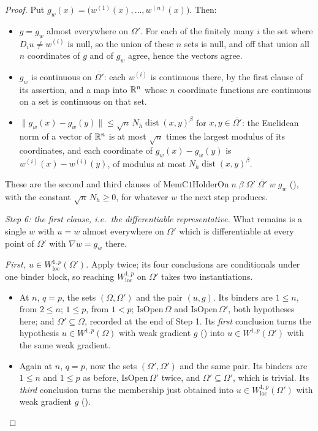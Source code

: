 \begin{proof}
Put $g_w(x)=\bigl(w^{(1)}(x),\dots,w^{(n)}(x)\bigr)$.  Then:
\begin{itemize}
\item $g=g_w$ almost everywhere on $\Omega'$.  For each of the finitely many $i$
  the set where $D_iu\ne w^{(i)}$ is null, so the union of these $n$ sets is
  null, and off that union all $n$ coordinates of $g$ and of $g_w$ agree, hence
  the vectors agree.
\item $g_w$ is continuous on $\overline{\Omega'}$: each $w^{(i)}$ is continuous
  there, by the first clause of its  assertion, and a map
  into $\mathbb{R}^n$ whose $n$ coordinate functions are continuous on a set is
  continuous on that set.
\item $\|g_w(x)-g_w(y)\|\le\sqrt n\,N_h\operatorname{dist}(x,y)^{\beta}$ for
  $x,y\in\overline{\Omega'}$: the Euclidean norm of a vector of $\mathbb{R}^n$ is at
  most $\sqrt n$ times the largest modulus of its coordinates, and each
  coordinate of $g_w(x)-g_w(y)$ is $w^{(i)}(x)-w^{(i)}(y)$, of modulus at most
  $N_h\operatorname{dist}(x,y)^{\beta}$.
\end{itemize}
These are the second and third clauses of
$\mathrm{MemC1HolderOn}\;n\;\beta\;\Omega'\;\overline{\Omega'}\;w\;g_w$
(), with the constant $\sqrt n\,N_h\ge0$, for whatever
$w$ the next step produces.

\emph{Step 6: the first clause, i.e.\ the differentiable representative.}  What
remains is a single $w$ with $u=w$ almost everywhere on $\Omega'$ which is
differentiable at every point of $\Omega'$ with $\nabla w=g_w$ there.

\emph{First, $u\in W^{1,p}_{\mathrm{loc}}(\Omega')$.}  Apply
 twice; its four conclusions are conditionals
under one binder block, so reaching $W^{1,p}_{\mathrm{loc}}$ on $\Omega'$ takes
two instantiations.
\begin{itemize}
\item At $n$, $q=p$, the sets $(\Omega,\Omega')$ and the pair $(u,g)$.  Its
  binders are $1\le n$, from $2\le n$; $1\le p$, from $1<p$;
  $\mathrm{IsOpen}\,\Omega$ and $\mathrm{IsOpen}\,\Omega'$, both hypotheses
  here; and $\Omega'\subseteq\Omega$, recorded at the end of Step 1.  Its
  \emph{first} conclusion turns the hypothesis $u\in W^{1,p}(\Omega)$ with weak
  gradient $g$ () into $u\in W^{1,p}(\Omega')$ with the same
  weak gradient.
\item Again at $n$, $q=p$, now the sets $(\Omega',\Omega')$ and the same pair.
  Its binders are $1\le n$ and $1\le p$ as before, $\mathrm{IsOpen}\,\Omega'$
  twice, and $\Omega'\subseteq\Omega'$, which is trivial.  Its \emph{third}
  conclusion turns the membership just obtained into
  $u\in W^{1,p}_{\mathrm{loc}}(\Omega')$ with weak gradient $g$
  ().
\end{itemize}


\end{proof}
